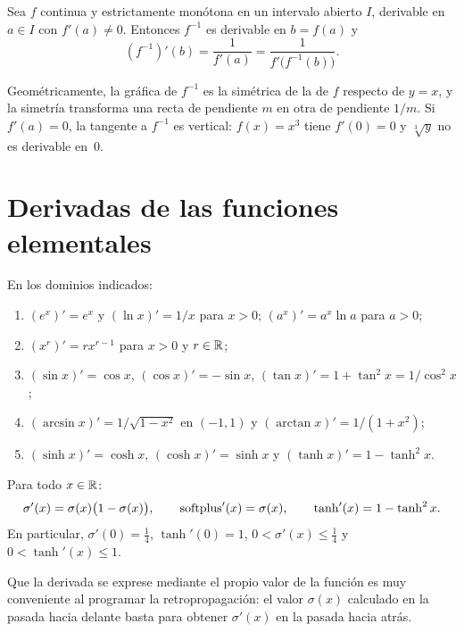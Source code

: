 \begin{teorema}\label{teo:inversa}
Sea $f$ continua y estrictamente monótona en un intervalo abierto $I$, derivable en $a\in I$ con $f'(a)\ne0$. Entonces $f^{-1}$ es derivable en $b=f(a)$ y
\[
(f^{-1})'(b)=\frac{1}{f'(a)}=\frac{1}{f'\bigl(f^{-1}(b)\bigr)}.
\]
\end{teorema}

Geométricamente, la gráfica de $f^{-1}$ es la simétrica de la de $f$ respecto de $y=x$, y la simetría transforma una recta de pendiente $m$ en otra de pendiente $1/m$. Si $f'(a)=0$, la tangente a $f^{-1}$ es vertical: $f(x)=x^{3}$ tiene $f'(0)=0$ y $\sqrt[3]{y}$ no es derivable en~0.

\section{Derivadas de las funciones elementales}

\begin{proposicion}\label{prop:tabla}
En los dominios indicados:
\begin{enumerate}
  \item $(e^{x})'=e^{x}$ y $(\ln x)'=1/x$ para $x>0$; $(a^{x})'=a^{x}\ln a$ para $a>0$;
  \item $(x^{r})'=rx^{r-1}$ para $x>0$ y $r\in\mathbb{R}$;
  \item $(\sin x)'=\cos x$, $(\cos x)'=-\sin x$, $(\tan x)'=1+\tan^{2}x=1/\cos^{2}x$;
  \item $(\arcsin x)'=1/\sqrt{1-x^{2}}$ en $(-1,1)$ y $(\arctan x)'=1/(1+x^{2})$;
  \item $(\sinh x)'=\cosh x$, $(\cosh x)'=\sinh x$ y $(\tanh x)'=1-\tanh^{2}x$.
\end{enumerate}
\end{proposicion}

\begin{proposicion}\label{prop:derivadas-activaciones}
Para todo $x\in\mathbb{R}$:
\[
\sigma'(x)=\sigma(x)\bigl(1-\sigma(x)\bigr),\qquad \operatorname{softplus}'(x)=\sigma(x),\qquad \tanh'(x)=1-\tanh^{2}x.
\]
En particular, $\sigma'(0)=\tfrac14$, $\tanh'(0)=1$, $0<\sigma'(x)\le\tfrac14$ y $0<\tanh'(x)\le1$.
\end{proposicion}

Que la derivada se exprese mediante el propio valor de la función es muy conveniente al programar la retropropagación: el valor $\sigma(x)$ calculado en la pasada hacia delante basta para obtener $\sigma'(x)$ en la pasada hacia atrás.

